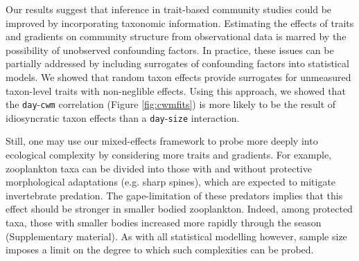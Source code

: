 \documentclass[12pt]{ecology}
\begin{document}
Our results suggest that inference in trait-based community studies could be improved by incorporating taxonomic information.  Estimating the effects of traits and gradients on community structure from observational data is marred by the possibility of unobserved confounding factors.  In practice, these issues can be partially addressed by including surrogates of confounding factors into statistical models.  We showed that random taxon effects provide surrogates for unmeasured taxon-level traits with non-neglible effects.  Using this approach, we showed that the \texttt{day}-\texttt{cwm} correlation (Figure \ref{fig:cwmfits}) is more likely to be the result of idiosyncratic taxon effects than a \texttt{day}-\texttt{size} interaction.

Still, one may use our mixed-effects framework to probe more deeply into ecological complexity by considering more traits and gradients.  For example, zooplankton taxa can be divided into those with and without protective morphological adaptations (e.g. sharp spines), which are expected to mitigate invertebrate predation.  The gape-limitation of these predators implies that this effect should be stronger in smaller bodied zooplankton.  Indeed, among protected taxa, those with smaller bodies increased more rapidly through the season (Supplementary material).  As with all statistical modelling however, sample size imposes a limit on the degree to which such complexities can be probed.







\end{document}
